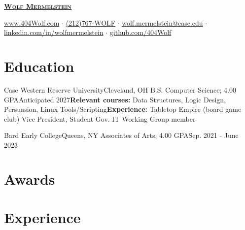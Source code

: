 \documentclass[letterpaper, 10pt]{article}
\begin{document}
	
	
	\begin{center}
		\textbf{\Huge \scshape \href{https://404wolf.com}{Wolf Mermelstein}} \\ \vspace{6pt}
		
		\href{https://404wolf.com}{www.404Wolf.com}
		$\cdot$
		\small \href{tel:(+12127679653)}{(212)767-WOLF}
		$\cdot$
		\href{mailto:wolf.mermelstein@case.edu}{wolf.mermelstein@case.edu}
		$\cdot$
		\href{https://linkedin.com/in/wolfmermelstein}{linkedin.com/in/wolfmermelstein}
		$\cdot$
		\href{https://github.com/404wolf}{github.com/404Wolf}
	\end{center}
	\vspace{-14px}
	
	\section{Education}
	\resumeSubHeadingListStart
	   \twoLineResumeSubheading
	   {Case Western Reserve University}{Cleveland, OH}{}
	   {B.S. Computer Science; 4.00 GPA}{Anticipated 2027}{\textbf{Relevant courses:} Data Structures, Logic Design, Persuasion, Linux Tools/Scripting}{\textbf{Experience:} Tabletop Empire (board game club) Vice President, Student Gov. IT Working Group member}

	   \resumeSubheading
	   {Bard Early College}{Queens, NY}{}
	   {Associates of Arts;  4.00 GPA}{Sep. 2021 - June 2023}{}
	\resumeSubHeadingListEnd
	
	\section{Awards}
	\resumeSubHeadingListStart
	
	
	
		
	\resumeSubHeadingListEnd
	
	\section{Experience}
	\resumeSubHeadingListStart
	
\end{document}

